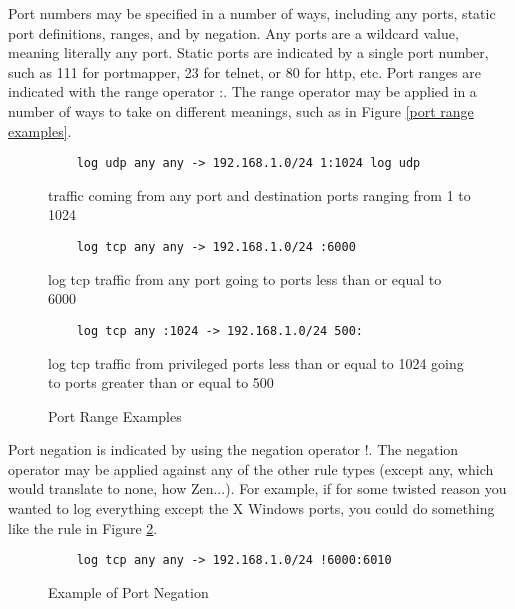 \documentclass[english]{report}
\begin{document}
Port numbers may be specified in a number of ways, including any ports, static
port definitions, ranges, and by negation. Any ports are a wildcard value,
meaning literally any port. Static ports are indicated by a single port number,
such as 111 for portmapper, 23 for telnet, or 80 for http, etc. Port ranges are
indicated with the range operator :. The range operator may be applied in a
number of ways to take on different meanings, such as in Figure \ref{port range
examples}.

\begin{center}
\begin{figure}
\begin{verbatim}
    log udp any any -> 192.168.1.0/24 1:1024 log udp 
\end{verbatim}

traffic coming from any port and destination ports ranging from 1 to 1024

\begin{verbatim}
    log tcp any any -> 192.168.1.0/24 :6000 
\end{verbatim}

log tcp traffic from any port going to ports less than or equal to 6000

\begin{verbatim}
    log tcp any :1024 -> 192.168.1.0/24 500: 
\end{verbatim}

log tcp traffic from privileged ports less than or equal to 1024 going to ports
greater than or equal to 500

\caption{\label{port range examples}Port Range Examples}
\end{figure}
\end{center}

Port negation is indicated by using the negation operator !.  The negation
operator may be applied against any of the other rule types (except any, which
would translate to none, how Zen...). For example, if for some twisted reason
you wanted to log everything except the X Windows ports, you could do something
like the rule in Figure \ref{example port negation}.

\begin{figure}
\begin{verbatim}
    log tcp any any -> 192.168.1.0/24 !6000:6010
\end{verbatim}

\caption{\label{example port negation}Example of Port Negation}
\end{figure}
\end{document}
